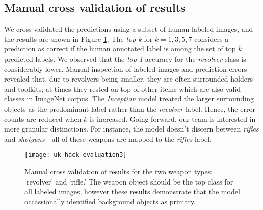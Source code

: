 \subsection{Manual cross validation of results}
We cross-validated the predictions using a subset of human-labeled images, and the results are shown in Figure \ref{fig:uk-hack-eval}. The \textit{top k} for $k=1,3,5,7$ considers a prediction as correct if the human annotated label is among the set of top $k$  predicted labels. We observed that the \textit{top 1} accuracy for the \textit{revolver} class is considerably lower. Manual inspection of labeled images and prediction errors revealed that, due to revolvers being smaller, they are often surrounded holders and toolkits; at times they rested on top of other items which are also valid classes in ImageNet corpus. The \textit{Inception} model treated the larger surrounding objects as the predominant label rather than the \textit{revolver} label. Hence, the error counts are reduced when $k$ is increased. Going forward, our team is interested in more granular distinctions. For instance, the model doesn't discern between \textit{rifles} and \textit{shotguns} - all of these weapons are mapped to the \textit{rifles} label. 

\begin{figure}[h]
	\texttt{[image: uk-hack-evaluation3]}
	\caption{Manual cross validation of results for the two weapon types: `revolver' and `rifle.' The weapon object should be the top class for all labeled images, however these results demonstrate that the model occassionally identified background objects as primary.}
	\label{fig:uk-hack-eval}
\end{figure}

